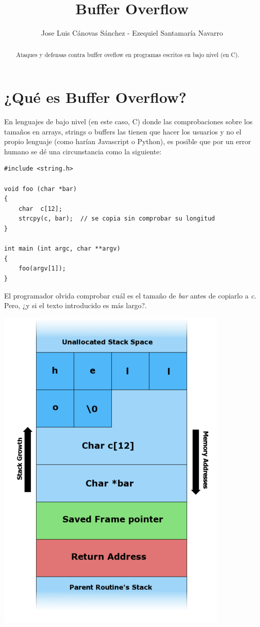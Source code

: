\documentclass[]{article}
\author{Jose Luis Cánovas Sánchez - Ezequiel Santamaría Navarro}
\title{Buffer Overflow}
\begin{document}
\maketitle

\begin{abstract}
	Ataques y defensas contra buffer oveflow en programas escritos en bajo nivel (en C).
\end{abstract}

\tableofcontents

\newpage

\section{¿Qué es Buffer Overflow?}

En lenguajes de bajo nivel (en este caso, C) donde las comprobaciones sobre los tamaños en arrays, strings o buffers las tienen que hacer los usuarios y no el propio lenguaje (como harían Javascript o Python), es posible que por un error humano se dé una circunstancia como la siguiente:

\begin{lstlisting}
#include <string.h>

void foo (char *bar)
{
	char  c[12];
	strcpy(c, bar);  // se copia sin comprobar su longitud
}

int main (int argc, char **argv)
{
	foo(argv[1]);
}
\end{lstlisting}

El programador olvida comprobar cuál es el tamaño de \textit{bar} antes de copiarlo a \textit{c}. Pero, ¿y si el texto introducido es más largo?.

\begin{center}
\includegraphics[width=0.5\linewidth]{so}
\end{center}
\end{document}
